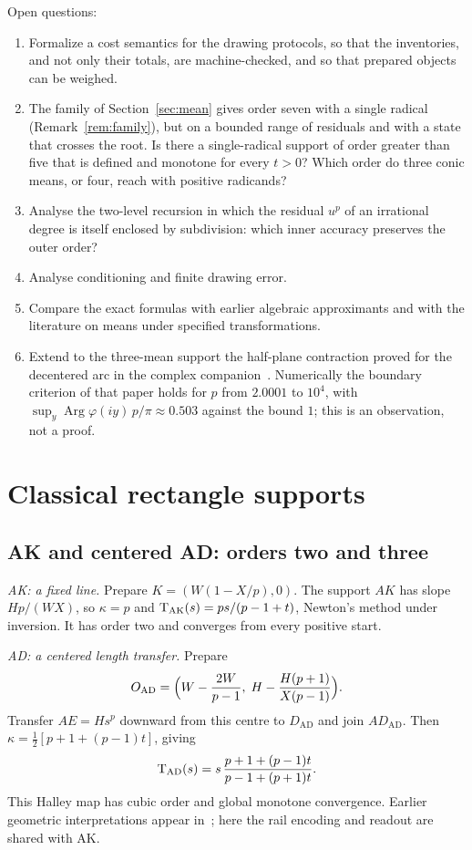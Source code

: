 Open questions:
\begin{enumerate}[label=\arabic*.]
\item Formalize a cost semantics for the drawing protocols, so that the inventories, and not only
  their totals, are machine-checked, and so that prepared objects can be weighed.
\item The family of Section~\ref{sec:mean} gives order seven with a single radical
  (Remark~\ref{rem:family}), but on a bounded range of residuals and with a state that crosses the
  root. Is there a single-radical support of order greater than five that is defined and monotone for
  every $t>0$? Which order do three conic means, or four, reach with positive radicands?
\item Analyse the two-level recursion in which the residual $u^{p}$ of an irrational degree is itself
  enclosed by subdivision: which inner accuracy preserves the outer order?
\item Analyse conditioning and finite drawing error.
\item Compare the exact formulas with earlier algebraic approximants and with the literature on means
  under specified transformations.
\item Extend to the three-mean support the half-plane contraction proved for the decentered arc in the
  complex companion~\cite{companion}. Numerically the boundary criterion of that paper holds for $p$
  from $2.0001$ to $10^{4}$, with $\sup_y\operatorname{Arg}\varphi(iy)\,p/\pi\approx0.503$ against the
  bound $1$; this is an observation, not a proof.
\end{enumerate}

\FloatBarrier
\appendix
\section{Classical rectangle supports}\label{app:classical}

\subsection{AK and centered AD: orders two and three}

\emph{AK: a fixed line.} Prepare $K=(W(1-X/p),0)$. The support $AK$ has slope $Hp/(WX)$, so
$\kappa=p$ and $\mathrm{T}_{\mathrm{AK}}(s)=ps/(p-1+t)$, Newton's method under inversion. It has order two and
converges from every positive start.

\emph{AD: a centered length transfer.} Prepare
\[ O_{\mathrm{AD}}=\Bigl(W-\frac{2W}{p-1},\;H-\frac{H(p+1)}{X(p-1)}\Bigr). \]
Transfer $AE=Hs^{p}$ downward from this centre to $D_{\mathrm{AD}}$ and join $AD_{\mathrm{AD}}$. Then
$\kappa=\tfrac12[p+1+(p-1)t]$, giving
\begin{equation}\label{eq:AD}
\mathrm{T}_{\mathrm{AD}}(s)=s\,\frac{p+1+(p-1)t}{p-1+(p+1)t}.
\end{equation}
This Halley map has cubic order and global monotone convergence. Earlier geometric interpretations
appear in~\cite{gander,scavo}; here the rail encoding and readout are shared with AK.

